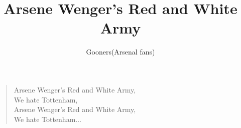 \documentclass[a4paper,12pt]{article}
\title{Arsene Wenger's Red and White Army}
\author{Gooners(Arsenal fans)}
\date{}
\begin{document}
	
	\maketitle
	
	\begin{verse}
		
		Arsene Wenger's Red and White Army, \\
		We hate Tottenham, \\
		Arsene Wenger's Red and White Army, \\
		We hate Tottenham$\ldots$
		
	\end{verse}
	
\end{document}

